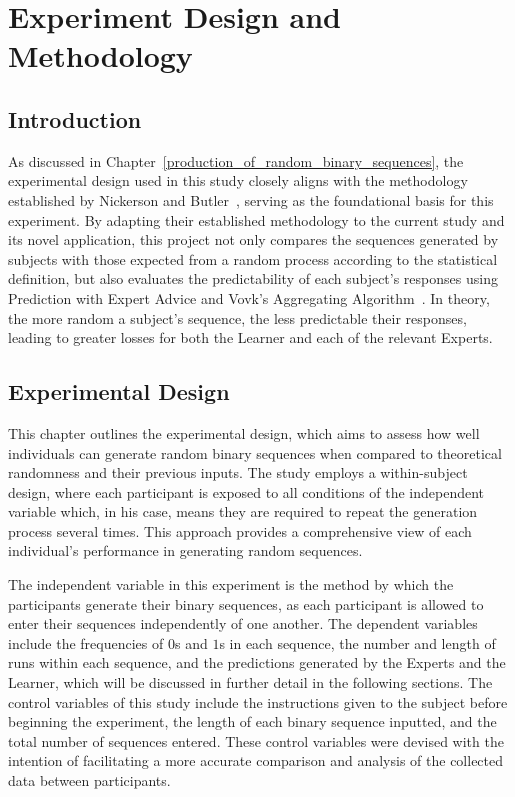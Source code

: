 \section{Experiment Design and Methodology}\label{section:Experiment_Design_and_Methodology}
\subsection{Introduction}
As discussed in Chapter~\ref{production_of_random_binary_sequences}, the experimental design used in this study closely aligns with the methodology established by Nickerson and Butler~\cite{nickerson:2009}, serving as the foundational basis for this experiment. By adapting their established methodology to the current study and its novel application, this project not only compares the sequences generated by subjects with those expected from a random process according to the statistical definition, but also evaluates the predictability of each subject's responses using Prediction with Expert Advice and Vovk's Aggregating Algorithm~\cite{vovk:1990}. In theory, the more random a subject's sequence, the less predictable their responses, leading to greater losses for both the Learner and each of the relevant Experts.

\subsection{Experimental Design}
This chapter outlines the experimental design, which aims to assess how well individuals can generate random binary sequences when compared to theoretical randomness and their previous inputs. The study employs a within-subject design, where each participant is exposed to all conditions of the independent variable which, in his case, means they are required to repeat the generation process several times. This approach provides a comprehensive view of each individual's performance in generating random sequences.

The independent variable in this experiment is the method by which the participants generate their binary sequences, as each participant is allowed to enter their sequences independently of one another. The dependent variables include the frequencies of $0$s and $1$s in each sequence, the number and length of runs within each sequence, and the predictions generated by the Experts and the Learner, which will be discussed in further detail in the following sections. The control variables of this study include the instructions given to the subject before beginning the experiment, the length of each binary sequence inputted, and the total number of sequences entered. These control variables were devised with the intention of facilitating a more accurate comparison and analysis of the collected data between participants.

